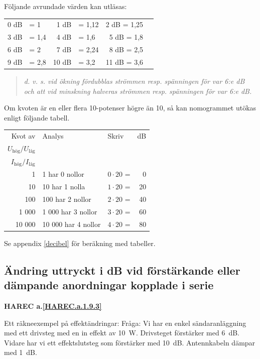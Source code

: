 Följande avrundade värden kan utläsas:

\begin{tabular}{rlrlrl}
0 dB & = 1   &  1 dB & = 1,12 &  2 dB = 1,25 \\
3 dB & = 1,4 &  4 dB & = 1,6  &  5 dB = 1,8 \\
6 dB & = 2   &  7 dB & = 2,24 &  8 dB = 2,5 \\
9 dB & = 2,8 & 10 dB & = 3,2  & 11 dB = 3,6
\end{tabular}

\begin{quote}\emph{
d. v. s. vid ökning fördubblas strömmen resp. spänningen för var 6:e dB och att
vid minskning halveras strömmen resp. spänningen för var 6:e dB.
}\end{quote}

Om kvoten är en eller flera 10-potenser högre än 10, så kan nomogrammet utökas
enligt följande tabell.

\begin{tabular}{rllr}
Kvot av & Analys             & Skriv            & dB \\
\(U_\text{hög}/U_\text{låg}\) &          &                  &    \\
\(I_\text{hög}/I_\text{låg}\) &          &                  &    \\
     1 & 1 har 0 nollor      & \(0 \cdot 20\) = &  0 \\
    10 & 10 har 1 nolla      & \(1 \cdot 20\) = & 20 \\
   100 & 100 har 2 nollor    & \(2 \cdot 20\) = & 40 \\
 1 000 &  1 000 har 3 nollor & \(3 \cdot 20\) = & 60 \\
10 000 & 10 000 har 4 nollor & \(4 \cdot 20\) = & 80
\end{tabular}

Se appendix \ref{decibel} för beräkning med tabeller.

\subsection{Ändring uttryckt i dB vid förstärkande eller dämpande anordningar kopplade i serie}
\textbf{HAREC a.\ref{HAREC.a.1.9.3}\label{myHAREC.a.1.9.3}}

Ett räkneexempel på effektändringar:
Fråga:
Vi har en enkel sändaranläggning med ett drivsteg med en in effekt av 10~W.
Drivsteget förstärker med 6~dB. Vidare har vi ett effektslutsteg som förstärker
med 10~dB. Antennkabeln dämpar med 1~dB.

